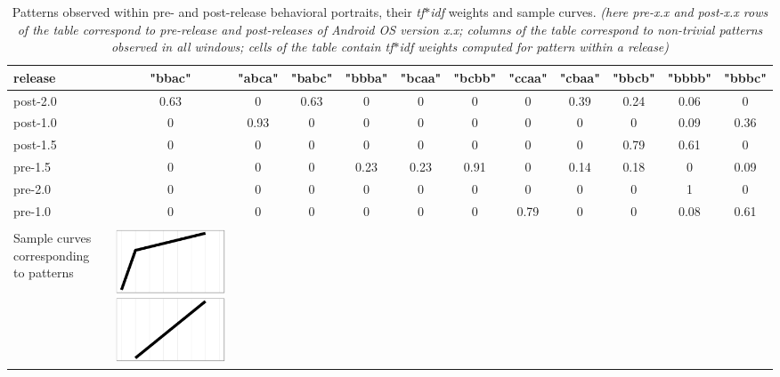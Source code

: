 \documentclass[conference]{worldcomp}
\begin{document}
\begin{table}
  \caption{Patterns observed within pre- and post-release behavioral portraits, their \textit{tf$\ast$idf} weights and sample curves.
  \textit{(here pre-\textit{x.x} and post-\textit{x.x} rows of the table correspond to pre-release and post-releases of Android OS version x.x; 
   columns of the table correspond to non-trivial patterns observed in all windows; cells of the table contain \textit{tf$\ast$idf} 
   weights computed for pattern within a release)}}
  \label{tab:tokens}
  \begin{tabular}{ | b{1.5cm} | c | c | c | c | c | c | c | c | c | c | c |}
  \hline
release & "bbac" & "abca" & "babc" & "bbba" & "bcaa" & "bcbb" & "ccaa" & "cbaa" & "bbcb" & "bbbb" & "bbbc"\\ 
  \hline
 post-2.0 & 0.63 & 0 & 0.63 & 0 & 0 & 0 & 0 & 0.39 & 0.24 & 0.06 & 0\\ 
 post-1.0 & 0 & 0.93 & 0 & 0 & 0 & 0 & 0 & 0 & 0 & 0.09 & 0.36\\ 
 post-1.5 & 0 & 0 & 0 & 0 & 0 & 0 & 0 & 0 & 0.79 & 0.61 & 0\\ 
 pre-1.5 & 0 & 0 & 0 & 0.23 & 0.23 & 0.91 & 0 & 0.14 & 0.18 & 0 & 0.09\\ 
 pre-2.0 & 0 & 0 & 0 & 0 & 0 & 0 & 0 & 0 & 0 & 1 & 0\\ 
 pre-1.0 & 0 & 0 & 0 & 0 & 0 & 0 & 0.79 & 0 & 0 & 0.08 & 0.61\\
 \hline 
 &  &  &  &  &  &  & &  &  &  & \\
 Sample curves corresponding to patterns &
 \includegraphics[scale=0.08]{figures/bbac.ps} &

\end{tabular}
\end{table}
\end{document}
